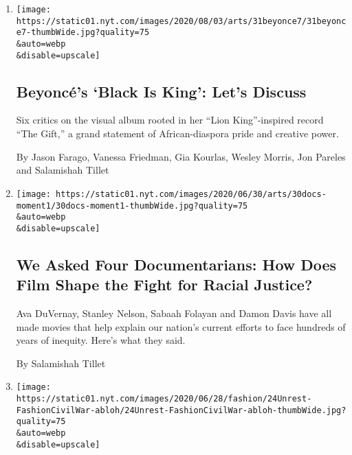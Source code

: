 \begin{enumerate}
\def\labelenumi{\arabic{enumi}.}
\item
  \href{/2020/07/31/arts/music/beyonce-black-is-king.html}{}

  \texttt{[image: https://static01.nyt.com/images/2020/08/03/arts/31beyonce7/31beyonce7-thumbWide.jpg?quality=75\\\&auto=webp\\\&disable=upscale]}

  \hypertarget{beyoncuxe9s-black-is-king-lets-discuss}{%
  \subsection{Beyoncé's `Black Is King': Let's
  Discuss}\label{beyoncuxe9s-black-is-king-lets-discuss}}

  Six critics on the visual album rooted in her ``Lion King''-inspired
  record ``The Gift,'' a grand statement of African-diaspora pride and
  creative power.

  By Jason Farago, Vanessa Friedman, Gia Kourlas, Wesley Morris, Jon
  Pareles and Salamishah Tillet
\item
  \href{/2020/06/30/movies/ava-duvernay-stanley-nelson-whose-streets.html}{}

  \texttt{[image: https://static01.nyt.com/images/2020/06/30/arts/30docs-moment1/30docs-moment1-thumbWide.jpg?quality=75\\\&auto=webp\\\&disable=upscale]}

  \hypertarget{we-asked-four-documentarians-how-does-film-shape-the-fight-for-racial-justice}{%
  \subsection{We Asked Four Documentarians: How Does Film Shape the
  Fight for Racial
  Justice?}\label{we-asked-four-documentarians-how-does-film-shape-the-fight-for-racial-justice}}

  Ava DuVernay, Stanley Nelson, Sabaah Folayan and Damon Davis have all
  made movies that help explain our nation's current efforts to face
  hundreds of years of inequity. Here's what they said.

  By Salamishah Tillet
\item
  \href{/2020/06/24/style/fashion-racism.html}{}

  \texttt{[image: https://static01.nyt.com/images/2020/06/28/fashion/24Unrest-FashionCivilWar-abloh/24Unrest-FashionCivilWar-abloh-thumbWide.jpg?quality=75\\\&auto=webp\\\&disable=upscale]}

  \hypertarget{its-time-to-end-racism-in-the-fashion-industry-but-how}{%
}
\end{enumerate}
